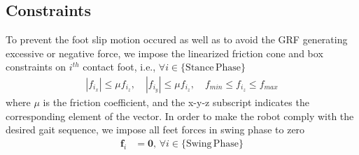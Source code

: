 \subsection{Constraints} \label{Constraints}
To prevent the foot slip motion occured as well as to avoid the GRF generating excessive or negative force, we impose the linearized friction cone and box constraints on $i^{th}$ contact foot, i.e., $\forall {i} \in \{\mathrm{Stance \, Phase}\}$
\begin{align}
\label{eq:NMPC_constraint3}
|{f}_{i_{x}}| \leq \mu {f}_{i_{z}}, \quad |{f}_{i_{y}}| \leq \mu {f}_{i_{z}}, \quad {f}_{min} \leq {f}_{i_{z}} \leq {f}_{max}
\end{align}
where $\mu$ is the friction coefficient, and the x-y-z subscript indicates the corresponding element of the vector. 
In order to make the robot comply with the desired gait sequence, we impose all feet forces in swing phase to zero
\begin{align}
\label{eq:NMPC_constraint4}
\mathbf{f}_{i} &= \mathbf{0}, \, \forall {i} \in \{\mathrm{Swing \, Phase}\}
\end{align}




